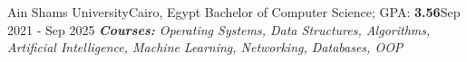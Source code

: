 
\resumeSubheading
{Ain Shams University}{Cairo, Egypt}
{Bachelor of Computer Science; GPA: \textbf{3.56}}{Sep 2021 - Sep 2025}
{\scriptsize \textit{ \footnotesize{\newline{}\textbf{
Courses:}  Operating Systems, Data Structures, Algorithms, Artificial Intelligence, Machine Learning, Networking, Databases, OOP}}}
